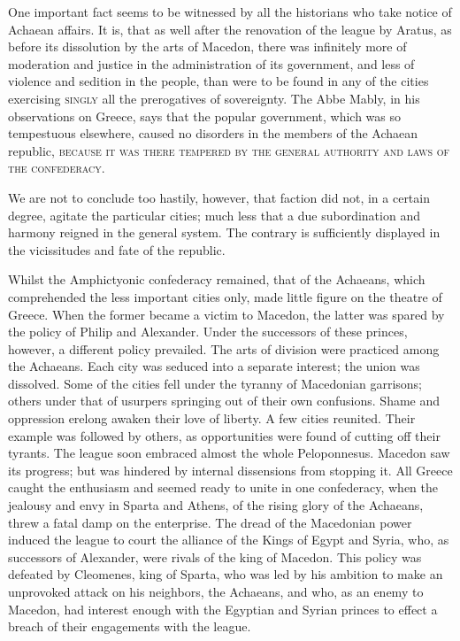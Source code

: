One important fact seems to be witnessed by all the historians who take notice of Achaean affairs. It is, that as well after the renovation of the league by Aratus, as before its dissolution by the arts of Macedon, there was infinitely more of moderation and justice in the administration of its government, and less of violence and sedition in the people, than were to be found in any of the cities exercising \textsc{singly} all the prerogatives of sovereignty. The Abbe Mably, in his observations on Greece, says that the popular government, which was so tempestuous elsewhere, caused no disorders in the members of the Achaean republic, \textsc{because it was there tempered by the general authority and laws of the confederacy}.

We are not to conclude too hastily, however, that faction did not, in a certain degree, agitate the particular cities; much less that a due subordination and harmony reigned in the general system. The contrary is sufficiently displayed in the vicissitudes and fate of the republic.

Whilst the Amphictyonic confederacy remained, that of the Achaeans, which comprehended the less important cities only, made little figure on the theatre of Greece. When the former became a victim to Macedon, the latter was spared by the policy of Philip and Alexander. Under the successors of these princes, however, a different policy prevailed. The arts of division were practiced among the Achaeans. Each city was seduced into a separate interest; the union was dissolved. Some of the cities fell under the tyranny of Macedonian garrisons; others under that of usurpers springing out of their own confusions. Shame and oppression erelong awaken their love of liberty. A few cities reunited. Their example was followed by others, as opportunities were found of cutting off their tyrants. The league soon embraced almost the whole Peloponnesus. Macedon saw its progress; but was hindered by internal dissensions from stopping it. All Greece caught the enthusiasm and seemed ready to unite in one confederacy, when the jealousy and envy in Sparta and Athens, of the rising glory of the Achaeans, threw a fatal damp on the enterprise. The dread of the Macedonian power induced the league to court the alliance of the Kings of Egypt and Syria, who, as successors of Alexander, were rivals of the king of Macedon. This policy was defeated by Cleomenes, king of Sparta, who was led by his ambition to make an unprovoked attack on his neighbors, the Achaeans, and who, as an enemy to Macedon, had interest enough with the Egyptian and Syrian princes to effect a breach of their engagements with the league.

